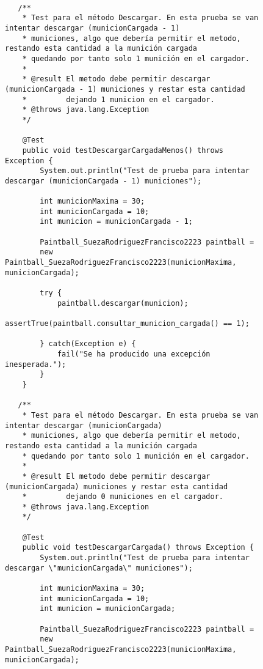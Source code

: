 \begin{figure}[H]
    \begin{tcolorbox}[sharp corners, colback=yellow!30, colframe=white!20]
        \tiny
        \begin{verbatim}

   /**
    * Test para el método Descargar. En esta prueba se van intentar descargar (municionCargada - 1)
    * municiones, algo que debería permitir el metodo, restando esta cantidad a la munición cargada
    * quedando por tanto solo 1 munición en el cargador.
    *
    * @result El metodo debe permitir descargar (municionCargada - 1) municiones y restar esta cantidad
    *         dejando 1 municion en el cargador.
    * @throws java.lang.Exception
    */

    @Test
    public void testDescargarCargadaMenos() throws Exception {
        System.out.println("Test de prueba para intentar descargar (municionCargada - 1) municiones");

        int municionMaxima = 30;
        int municionCargada = 10;
        int municion = municionCargada - 1;

        Paintball_SuezaRodriguezFrancisco2223 paintball =
        new Paintball_SuezaRodriguezFrancisco2223(municionMaxima, municionCargada);

        try {
            paintball.descargar(municion);
            assertTrue(paintball.consultar_municion_cargada() == 1);

        } catch(Exception e) {
            fail("Se ha producido una excepción inesperada.");
        }
    }

   /**
    * Test para el método Descargar. En esta prueba se van intentar descargar (municionCargada)
    * municiones, algo que debería permitir el metodo, restando esta cantidad a la munición cargada
    * quedando por tanto solo 1 munición en el cargador.
    *
    * @result El metodo debe permitir descargar (municionCargada) municiones y restar esta cantidad
    *         dejando 0 municiones en el cargador.
    * @throws java.lang.Exception
    */

    @Test
    public void testDescargarCargada() throws Exception {
        System.out.println("Test de prueba para intentar descargar \"municionCargada\" municiones");

        int municionMaxima = 30;
        int municionCargada = 10;
        int municion = municionCargada;

        Paintball_SuezaRodriguezFrancisco2223 paintball =
        new Paintball_SuezaRodriguezFrancisco2223(municionMaxima, municionCargada);


\end{verbatim}
\end{tcolorbox}
\end{figure}
